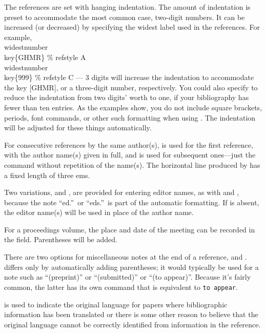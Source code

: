 The references are set with hanging indentation.  The amount of indentation
is preset to accommodate the most common case, two-digit numbers.
It can be increased (or decreased) by specifying the widest
label used in the references. For example,
\beginexample{}
\\widestnumber\\key\{GHMR\} \% refstyle A
\\widestnumber\\key\{999\} \% refstyle C --- 3 digits
\endexample
\noindent
will increase the indentation to accommodate the key \hbox{[GHMR]}, or a
three-digit number, respectively.   You could also specify
 to reduce the indentation from two digits'
worth to one, if your bibliography has fewer than ten entries. As the
examples show, you do not include square brackets, periods, font
commands, or other such formatting when using .  The
indentation will be adjusted for these things automatically.

For consecutive references by the same author(s),   is used for
the first reference, with the author name(s) given in full, and
 is used for subsequent ones---just the command 
without repetition of the name(s). The horizontal line produced by
 has a fixed length of three ems.

Two variations,  and , are provided for entering editor
names, as with  and , because the note ``ed.''\ or
``eds.''\ is part of the automatic formatting.  If  is absent,
the editor name(s) will be used in place of the author name.

For a proceedings volume, the place and date of the meeting can
be recorded in the  field.  Parentheses will be
added.

There are two options for miscellaneous notes at the end of a reference,
 and .   differs only by
automatically adding parentheses; it would typically be used for
a note such as ``(preprint)'' or ``(submitted)'' or ``(to appear)''.
Because it's fairly common, the latter has its own command 
that is equivalent to  {\tt to appear}.

 is used to indicate the original language for papers where
bibliographic information has been translated or there is some other reason
to believe that the original language cannot be correctly identified from
information in the reference.

